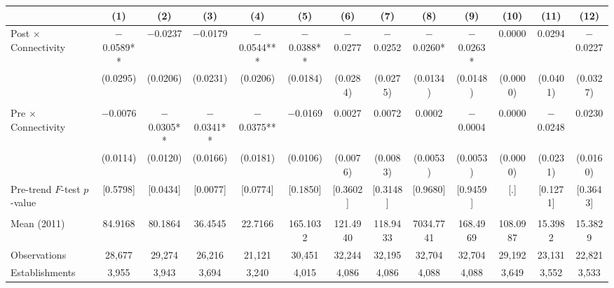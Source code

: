 \documentclass[12pt,letterpaper]{article}
\begin{document}
\begin{table}[]
\begin{threeparttable}
\begin{tabular}{lcccccccccccc}
 & (1) & (2) & (3) & (4) & (5) & (6) & (7) & (8) & (9) & (10) & (11) & (12) \\
\midrule
Post $\times$ Connectivity & $-$0.0589** & $-$0.0237 & $-$0.0179 & $-$0.0544*** & $-$0.0388** & $-$0.0277 & $-$0.0252 & $-$0.0260* & $-$0.0263* & 0.0000 & 0.0294 & $-$0.0227 \\
  & (0.0295) & (0.0206) & (0.0231) & (0.0206) & (0.0184) & (0.0284) & (0.0275) & (0.0134) & (0.0148) & (0.0000) & (0.0401) & (0.0327) \\
  &  &  &  &  &  &  &  &  &  &  &  & \\
Pre $\times$ Connectivity & $-$0.0076 & $-$0.0305** & $-$0.0341** & $-$0.0375** & $-$0.0169 & 0.0027 & 0.0072 & 0.0002 & $-$0.0004 & 0.0000 & $-$0.0248 & 0.0230 \\
  & (0.0114) & (0.0120) & (0.0166) & (0.0181) & (0.0106) & (0.0076) & (0.0083) & (0.0053) & (0.0053) & (0.0000) & (0.0231) & (0.0160) \\
Pre-trend $F$-test $p$-value & [0.5798] & [0.0434] & [0.0077] & [0.0774] & [0.1850] & [0.3602] & [0.3148] & [0.9680] & [0.9459] & [.] & [0.1271] & [0.3643] \\
  &  &  &  &  &  &  &  &  &  &  &  & \\
Mean (2011) & 84.9168 & 80.1864 & 36.4545 & 22.7166 & 165.1032 & 121.4940 & 118.9433 & 7034.7741 & 168.4969 & 108.0987 & 15.3982 & 15.3829 \\
Observations & 28{,}677 & 29{,}274 & 26{,}216 & 21{,}121 & 30{,}451 & 32{,}244 & 32{,}195 & 32{,}704 & 32{,}704 & 29{,}192 & 23{,}131 & 22{,}821 \\
Establishments & 3{,}955 & 3{,}943 & 3{,}694 & 3{,}240 & 4{,}015 & 4{,}086 & 4{,}086 & 4{,}088 & 4{,}088 & 3{,}649 & 3{,}552 & 3{,}533 \\
\bottomrule
\end{tabular}
\scriptsize
\begin{tablenotes}

\end{tablenotes}
\end{threeparttable}
\end{table}
\end{document}
